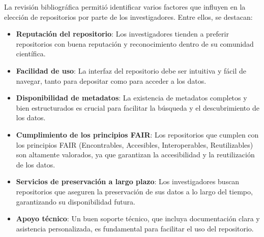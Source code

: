 \documentclass{article}
\begin{document}
La revisión bibliográfica permitió identificar varios factores que influyen en la elección de repositorios por parte de los investigadores. Entre ellos, se destacan:
\begin{itemize}
    \item \textbf{Reputación del repositorio}: Los investigadores tienden a preferir repositorios con buena reputación y reconocimiento dentro de su comunidad científica.
    \item \textbf{Facilidad de uso}: La interfaz del repositorio debe ser intuitiva y fácil de navegar, tanto para depositar como para acceder a los datos.
    \item \textbf{Disponibilidad de metadatos}: La existencia de metadatos completos y bien estructurados es crucial para facilitar la búsqueda y el descubrimiento de los datos.
    \item \textbf{Cumplimiento de los principios FAIR}: Los repositorios que cumplen con los principios FAIR (Encontrables, Accesibles, Interoperables, Reutilizables) son altamente valorados, ya que garantizan la accesibilidad y la reutilización de los datos.
    \item \textbf{Servicios de preservación a largo plazo}: Los investigadores buscan repositorios que aseguren la preservación de sus datos a lo largo del tiempo, garantizando su disponibilidad futura.
    \item \textbf{Apoyo técnico}: Un buen soporte técnico, que incluya documentación clara y asistencia personalizada, es fundamental para facilitar el uso del repositorio.
\end{itemize}
\end{document}
